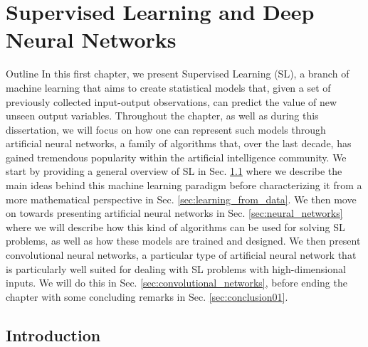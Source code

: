 \chapter{Supervised Learning and Deep Neural Networks}
\label{ch:supervised_learning}

\begin{remark}{Outline}
	In this first chapter, we present Supervised Learning (SL), a branch of machine learning that aims to create statistical models that, given a set of previously collected input-output observations, can predict the value of new unseen output variables. Throughout the chapter, as well as during this dissertation, we will focus on how one can represent such models through artificial neural networks, a family of algorithms that, over the last decade, has gained tremendous popularity within the artificial intelligence community. We start by providing a general overview of SL in Sec. \ref{sec:introduction01} where we describe the main ideas behind this machine learning paradigm before characterizing it from a more mathematical perspective in Sec. \ref{sec:learning_from_data}. We then move on towards presenting artificial neural networks in Sec. \ref{sec:neural_networks} where we will describe how this kind of algorithms can be used for solving SL problems, as well as how these models are trained and designed. We then present convolutional neural networks, a particular type of artificial neural network that is particularly well suited for dealing with SL problems with high-dimensional inputs. We will do this in Sec. \ref{sec:convolutional_networks}, before ending the chapter with some concluding remarks in Sec. \ref{sec:conclusion01}.   
\end{remark}

\section{Introduction}
\label{sec:introduction01}


